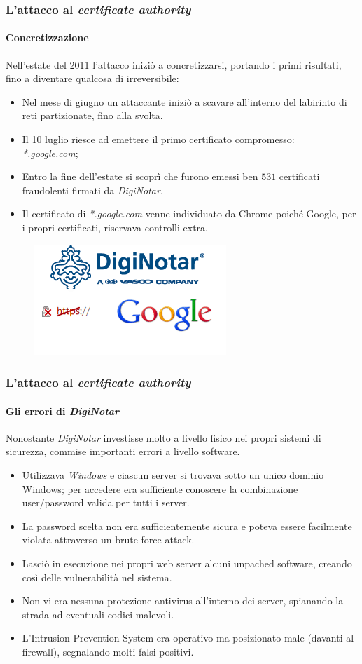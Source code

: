 \documentclass{beamer}
\begin{document}
\begin{frame}
\frametitle{L'attacco al \textit{certificate authority}}
\framesubtitle{Concretizzazione}
Nell'\alert{estate del 2011} l'attacco iniziò a concretizzarsi, portando i primi risultati, fino a diventare qualcosa di irreversibile:
\begin{itemize}
	\item Nel mese di giugno un attaccante iniziò a scavare all'interno del labirinto di reti partizionate, fino alla svolta.
	\item Il 10 luglio riesce ad emettere il \alert{primo certificato} compromesso:\\
	\alert{\textit{*.google.com}};
	\item Entro la fine dell'estate si scoprì che furono emessi ben \alert{$531$ certificati} fraudolenti firmati da \textit{DigiNotar}.
	\item Il certificato di \textit{*.google.com} venne individuato da \alert{Chrome} poiché Google, per i propri certificati, riservava \alert{controlli extra}.
\end{itemize}
\begin{figure}[H]
	\centering
	\includegraphics[scale=0.55]{cert}
\end{figure}
\end{frame}


\begin{frame}
\frametitle{L'attacco al \textit{certificate authority}}
\framesubtitle{Gli errori di \textit{DigiNotar}}
Nonostante \textit{DigiNotar} investisse molto a livello fisico nei propri sistemi di sicurezza, commise importanti \alert{errori a livello software}.
\begin{itemize}
	\item Utilizzava \textit{Windows} e ciascun server si trovava sotto un \alert{unico dominio Windows}; per accedere era sufficiente conoscere la combinazione user/password valida per tutti i server.
	\item La password scelta non era sufficientemente sicura e poteva essere facilmente violata attraverso un \alert{brute-force attack}.
	\item Lasciò in esecuzione nei propri web server alcuni \alert{unpached software}, creando così delle vulnerabilità nel sistema.
	\item Non vi era \alert{nessuna protezione antivirus} all'interno dei server, spianando la strada ad eventuali codici malevoli.
	\item L'\alert{Intrusion Prevention System} era operativo ma \alert{posizionato male} (davanti al firewall), segnalando molti \alert{falsi positivi}.
\end{itemize}
\end{frame}
\end{document}
